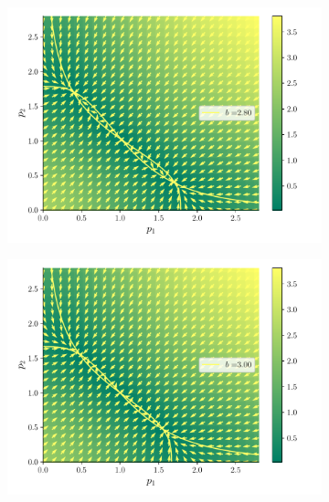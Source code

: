 \documentclass[twocolumn,aps,prl]{revtex4-1}
\begin{document}
\begin{figure}[ht!]
\begin{subfigure}[b]{0.49\linewidth}
  \end{subfigure}\quad
  \begin{subfigure}[b]{0.49\linewidth}
      \centering
      \includegraphics[width = 0.999\textwidth]{figuras/ex02-cosa2-2.pdf}
  \end{subfigure}\quad
  \begin{subfigure}[b]{0.49\linewidth}
      \centering
      \includegraphics[width = 0.999\textwidth]{figuras/ex02-cosa2-3.pdf}
  \end{subfigure}\quad
  \begin{subfigure}[b]{0.49\linewidth}
      \centering

\end{subfigure}
\end{figure}
\end{document}
